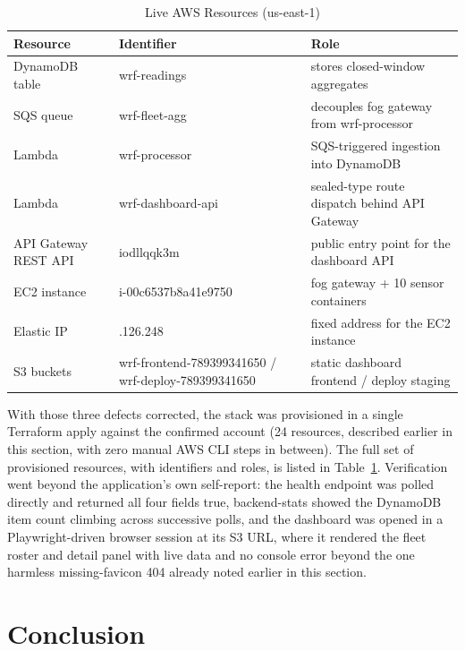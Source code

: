 \documentclass[conference]{IEEEtran}
\begin{document}
\begin{table}[!t]
\caption{Live AWS Resources (us-east-1)}
\label{tab:resources}
\centering
\footnotesize
\begin{tabular}{|>{\raggedright\arraybackslash}p{1.7cm}|>{\raggedright\arraybackslash}p{2.9cm}|>{\raggedright\arraybackslash}p{2.6cm}|}
\hline
\textbf{Resource} & \textbf{Identifier} & \textbf{Role} \\
\hline
DynamoDB table & wrf-readings & stores closed-window aggregates \\
\hline
SQS queue & wrf-fleet-agg & decouples fog gateway from wrf-processor \\
\hline
Lambda & wrf-processor & SQS-triggered ingestion into DynamoDB \\
\hline
Lambda & wrf-dashboard-api & sealed-type route dispatch behind API Gateway \\
\hline
API Gateway REST API & iodllqqk3m & public entry point for the dashboard API \\
\hline
EC2 instance & i-00c6537b8a41e9750 & fog gateway + 10 sensor containers \\
\hline
Elastic IP & 3.211.126.248 & fixed address for the EC2 instance \\
\hline
S3 buckets & wrf-frontend-789399341650 / wrf-deploy-789399341650 & static dashboard frontend / deploy staging \\
\hline
\end{tabular}
\end{table}

With those three defects corrected, the stack was provisioned in a single Terraform apply against the confirmed account (24 resources, described earlier in this section, with zero manual AWS CLI steps in between). The full set of provisioned resources, with identifiers and roles, is listed in Table~\ref{tab:resources}. Verification went beyond the application's own self-report: the health endpoint was polled directly and returned all four fields true, backend-stats showed the DynamoDB item count climbing across successive polls, and the dashboard was opened in a Playwright-driven browser session at its S3 URL, where it rendered the fleet roster and detail panel with live data and no console error beyond the one harmless missing-favicon 404 already noted earlier in this section.

\section{Conclusion}
\end{document}
